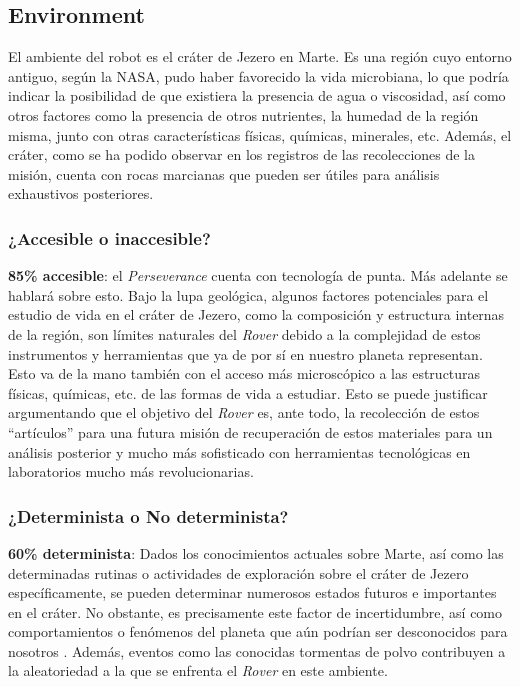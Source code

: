 \documentclass[12pt, letterpaper]{article}
\begin{document}
    \subsection{Environment}\label{environment}

    El ambiente del robot es el cráter de Jezero en Marte. Es una región cuyo entorno antiguo, según la NASA, pudo haber favorecido la vida microbiana, lo que podría indicar la posibilidad de que existiera la presencia de agua o viscosidad, así como otros factores como la presencia de otros nutrientes, la humedad de la región misma, junto con otras características físicas, químicas, minerales, etc. Además, el cráter, como se ha podido observar en los registros de las recolecciones de la misión, cuenta con rocas marcianas que pueden ser útiles para análisis exhaustivos posteriores.
    
        \subsubsection{¿Accesible o inaccesible?}

        \textbf{85\% accesible}: el \textit{Perseverance} cuenta con tecnología de punta. Más adelante se hablará sobre esto. Bajo la lupa geológica, algunos factores potenciales para el estudio de vida en el cráter de Jezero, como la composición y estructura internas de la región, son límites naturales del \textit{Rover} debido a la complejidad de estos instrumentos y herramientas que ya de por sí en nuestro planeta representan. Esto va de la mano también con el acceso más microscópico a las estructuras físicas, químicas, etc. de las formas de vida a estudiar. Esto se puede justificar argumentando que el objetivo del \textit{Rover} es, ante todo, la recolección de estos “artículos” para una futura misión de recuperación de estos materiales para un análisis posterior y mucho más sofisticado con herramientas tecnológicas en laboratorios mucho más revolucionarias.
    
        \subsubsection{¿Determinista o No determinista?}

        \textbf{60\% determinista}: Dados los conocimientos actuales sobre Marte, así como las determinadas rutinas o actividades de exploración sobre el cráter de Jezero específicamente, se pueden determinar numerosos estados futuros e importantes en el cráter. No obstante, es precisamente este factor de incertidumbre, así como comportamientos o fenómenos del planeta que aún podrían ser desconocidos para nosotros \cite{pardo2020geologia}. Además, eventos como las conocidas tormentas de polvo contribuyen a la aleatoriedad a la que se enfrenta el \textit{Rover} en este ambiente.
        
\end{document}
